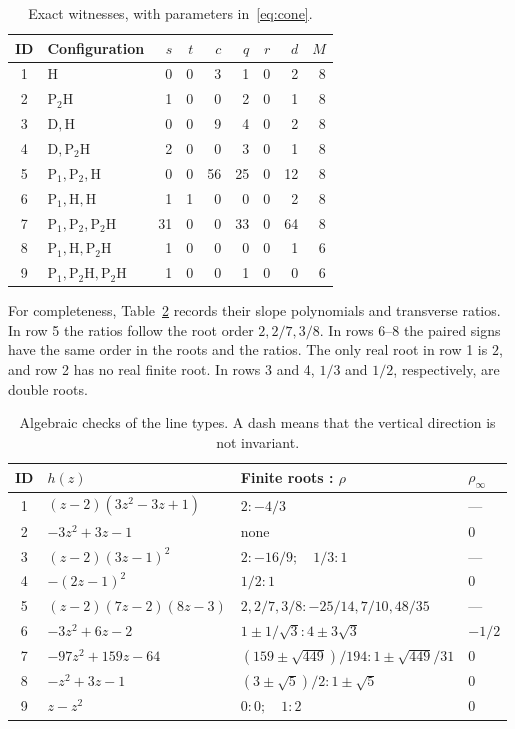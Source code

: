 \documentclass[11pt,a4paper]{article}
\theoremstyle{definition}\newtheorem{definition}[theorem]{Definition}
\newcommand{\HH}{\mathrm H}
\newcommand{\PP}{\mathrm P}
\newcommand{\DD}{\mathrm D}
\begin{document}
\begin{table}[ht]
\centering\small
\begin{tabular}{@{}clrrrrrrr@{}}
\toprule
ID & Configuration & $s$ & $t$ & $c$ & $q$ & $r$ & $d$ & $M$\\
\midrule
1 & $\HH$ & 0&0&3&1&0&2&8\\
2 & $\PP_2\HH$ & 1&0&0&2&0&1&8\\
3 & $\DD,\HH$ & 0&0&9&4&0&2&8\\
4 & $\DD,\PP_2\HH$ & 2&0&0&3&0&1&8\\
5 & $\PP_1,\PP_2,\HH$ & 0&0&56&25&0&12&8\\
6 & $\PP_1,\HH,\HH$ & 1&1&0&0&0&2&8\\
7 & $\PP_1,\PP_2,\PP_2\HH$ & 31&0&0&33&0&64&8\\
8 & $\PP_1,\HH,\PP_2\HH$ & 1&0&0&0&0&1&6\\
9 & $\PP_1,\PP_2\HH,\PP_2\HH$ & 1&0&0&1&0&0&6\\
\bottomrule
\end{tabular}
\caption{Exact witnesses, with parameters in~\eqref{eq:cone}.}
\label{tab:witness}
\end{table}

\clearpage
For completeness, Table~\ref{tab:h} records their slope polynomials and
transverse ratios. In row 5 the ratios follow the root order
$2,2/7,3/8$. In rows 6--8 the paired signs have the same order in the
roots and the ratios. The only real root in row 1 is $2$, and row 2 has
no real finite root. In rows 3 and 4, $1/3$ and $1/2$, respectively, are
double roots.

\begin{table}[ht]
\centering\small
\renewcommand{\arraystretch}{1.2}
\begin{tabular}{@{}clll@{}}
\toprule
ID & $h(z)$ & Finite roots : $\rho$ & $\rho_\infty$\\
\midrule
1 & $(z-2)(3z^2-3z+1)$ & $2:-4/3$ & ---\\
2 & $-3z^2+3z-1$ & none & $0$\\
3 & $(z-2)(3z-1)^2$ & $2:-16/9;\quad 1/3:1$ & ---\\
4 & $-(2z-1)^2$ & $1/2:1$ & $0$\\
5 & $(z-2)(7z-2)(8z-3)$ & $2,2/7,3/8:-25/14,7/10,48/35$ & ---\\
6 & $-3z^2+6z-2$ & $1\pm1/\sqrt3:4\pm3\sqrt3$ & $-1/2$\\
7 & $-97z^2+159z-64$ & $(159\pm\sqrt{449})/194:1\pm\sqrt{449}/31$ & $0$\\
8 & $-z^2+3z-1$ & $(3\pm\sqrt5)/2:1\pm\sqrt5$ & $0$\\
9 & $z-z^2$ & $0:0;\quad 1:2$ & $0$\\
\bottomrule
\end{tabular}
\caption{Algebraic checks of the line types. A dash means that the vertical
direction is not invariant.}
\label{tab:h}
\end{table}
\end{document}
